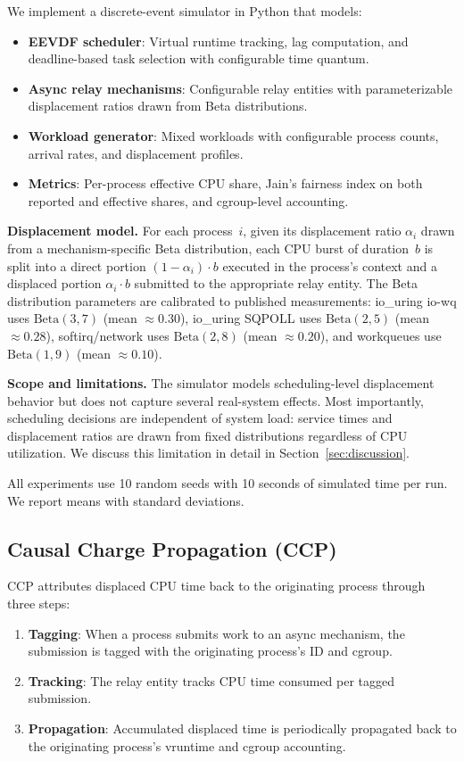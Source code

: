 \documentclass{article}
\newcommand{\displacement}{\alpha}
\begin{document}
We implement a discrete-event simulator in Python that models:

\begin{itemize}
    \item \textbf{EEVDF scheduler}: Virtual runtime tracking, lag computation, and deadline-based task selection with configurable time quantum.
    \item \textbf{Async relay mechanisms}: Configurable relay entities with parameterizable displacement ratios drawn from Beta distributions.
    \item \textbf{Workload generator}: Mixed workloads with configurable process counts, arrival rates, and displacement profiles.
    \item \textbf{Metrics}: Per-process effective CPU share, Jain's fairness index on both reported and effective shares, and cgroup-level accounting.
\end{itemize}

\textbf{Displacement model.} For each process~$i$, given its displacement ratio $\displacement_i$ drawn from a mechanism-specific Beta distribution, each CPU burst of duration~$b$ is split into a direct portion $(1 - \displacement_i) \cdot b$ executed in the process's context and a displaced portion $\displacement_i \cdot b$ submitted to the appropriate relay entity. The Beta distribution parameters are calibrated to published measurements: io\_uring io-wq uses $\text{Beta}(3, 7)$ (mean $\approx 0.30$), io\_uring SQPOLL uses $\text{Beta}(2, 5)$ (mean $\approx 0.28$), softirq/network uses $\text{Beta}(2, 8)$ (mean $\approx 0.20$), and workqueues use $\text{Beta}(1, 9)$ (mean $\approx 0.10$).

\textbf{Scope and limitations.}
The simulator models scheduling-level displacement behavior but does not capture several real-system effects. Most importantly, scheduling decisions are independent of system load: service times and displacement ratios are drawn from fixed distributions regardless of CPU utilization. We discuss this limitation in detail in Section~\ref{sec:discussion}.

All experiments use 10 random seeds with 10 seconds of simulated time per run. We report means with standard deviations.

\subsection{Causal Charge Propagation (CCP)}

CCP attributes displaced CPU time back to the originating process through three steps:
\begin{enumerate}
    \item \textbf{Tagging}: When a process submits work to an async mechanism, the submission is tagged with the originating process's ID and cgroup.
    \item \textbf{Tracking}: The relay entity tracks CPU time consumed per tagged submission.
    \item \textbf{Propagation}: Accumulated displaced time is periodically propagated back to the originating process's vruntime and cgroup accounting.
\end{enumerate}
\end{document}
